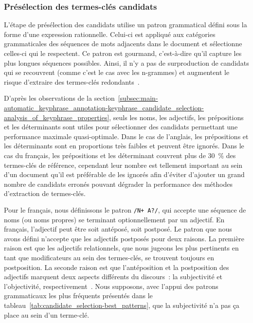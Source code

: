       \subsubsection{Présélection des termes-clés candidats}
      \label{subsubsec:main-automatic_keyphrase_annotation-keyphrase_candidate_selection-modifiers_filtering-candidate_pre_selection}
        L'étape de présélection des candidats utilise un patron grammatical
        défini sous la forme d'une expression rationnelle. Celui-ci est appliqué
        aux catégories grammaticales des séquences de mots adjacents dans le
        document et sélectionne celles-ci qui le respectent. Ce patron est
        gourmand, c'est-à-dire qu'il capture les plus longues séquences
        possibles. Ainsi, il n'y a pas de surproduction de candidats qui se
        recouvrent (comme c'est le cas avec les n-grammes) et augmentent le
        risque d'extraire des termes-clés
        redondants~\cite{hasan2014state_of_the_art}.

        D'après les observations de la
        section~\ref{subsec:main-automatic_keyphrase_annotation-keyphrase_candidate_selection-analysis_of_keyphrase_properties},
        seuls les noms, les adjectifs, les prépositions et les déterminants sont
        utiles pour sélectionner des candidats permettant une performance
        maximale quasi-optimale. Dans le cas de l'anglais, les prépositions et
        les déterminants sont en proportions très faibles et peuvent être
        ignorés. Dans le cas du français, les prépositions et les déterminant
        couvrent plus de 30~\% des termes-clés de référence, cependant leur
        nombre est tellement important au sein d'un document  qu'il est préférable de les ignorés afin d'éviter d'ajouter un
        grand nombre de candidats erronés pouvant dégrader la performance des
        méthodes d'extraction de termes-clés.
        
        Pour le français, nous définissons le patron \texttt{/N+ A?/}, qui
        accepte une séquence de noms (ou noms propres) se terminant
        optionnellement par un adjectif. En français, l'adjectif peut être soit
        antéposé, soit postposé. Le patron que nous avons défini n'accepte que
        les adjectifs postposés pour deux raisons. La première raison est que
        les adjectifs relationnels, que nous jugeons les plus pertinents en tant
        que modificateurs au sein des termes-clés, se trouvent toujours en
        postposition. La seconde raison est que l'antéposition et la
        postposition des adjectifs marquent deux aspects différents du
        discours~: la subjectivité et l'objectivité,
        respectivement~\cite{eskenazi2005adjectifavantapres}. Nous supposons,
        avec l'appui des patrons grammaticaux les plus fréquents présentés dans
        le tableau~\ref{tab:candidate_selection-best_patterns}, que la
        subjectivité n'a pas ça place au sein d'un terme-clé.
        
